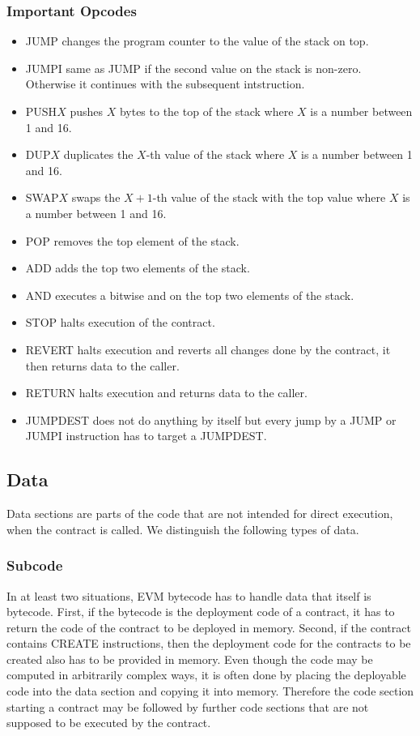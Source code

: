 \documentclass{article}
\begin{document}
\subsubsection{Important Opcodes}
    \label{opcodes}
    \begin{itemize}
        \item JUMP changes the program counter to the value of the stack on top.
        \item JUMPI same as JUMP if the second value on the stack is non-zero. Otherwise it continues with the subsequent intstruction.
        \item PUSH$X$ pushes $X$ bytes to the top of the stack where $X$ is a number between 1 and 16.
        \item DUP$X$ duplicates the $X$-th value of the stack where $X$ is a number between 1 and 16.
        \item SWAP$X$ swaps the $X+1$-th value of the stack with the top value where $X$ is a number between 1 and 16.
        \item POP removes the top element of the stack.
        \item ADD adds the top two elements of the stack.
        \item AND executes a bitwise and on the top two elements of the stack.
        \item STOP halts execution of the contract.
        \item REVERT halts execution and reverts all changes done by the contract, it then returns data to the caller.
        \item RETURN halts execution and returns data to the caller.
        \item JUMPDEST does not do anything by itself but every jump by a JUMP or JUMPI instruction has to target a JUMPDEST.
    \end{itemize}

\subsection{Data}
    Data sections are parts of the code that are not intended for direct execution, when the contract is called. We distinguish the following types of data.
\subsubsection{Subcode}
    In at least two situations, EVM bytecode has to handle data that itself is bytecode. First, if the bytecode is the deployment code of a contract,     it has to return the code of the contract to be deployed in memory. Second, if the contract contains CREATE instructions, then the deployment code for the contracts to be created also has to be provided in memory. Even though the code may be computed in arbitrarily complex ways, it is often done by placing the deployable code into the data section and copying it into memory. Therefore the code section starting a contract may be followed by further code sections that are not supposed to be executed by the contract.
\end{document}
